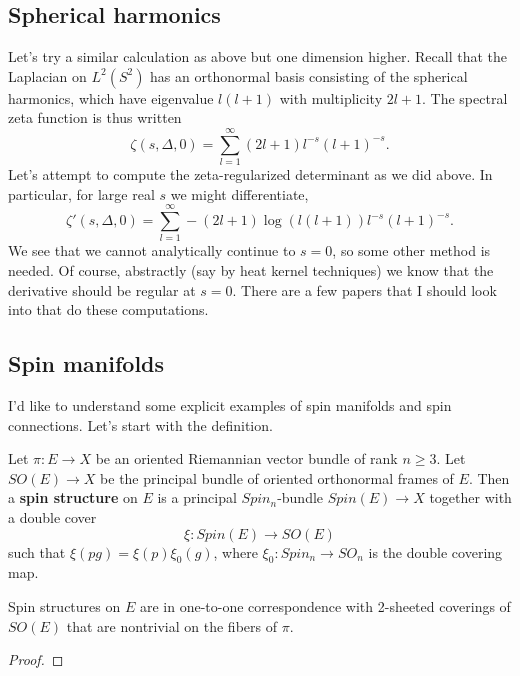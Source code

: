 \documentclass{amsart}
\begin{document}
\subsection{Spherical harmonics}

Let's try a similar calculation as above but one dimension higher. Recall
that the Laplacian on $L^2(S^2)$ has an orthonormal basis consisting of the
spherical harmonics, which have eigenvalue $l(l+1)$ with multiplicity $2l+1$.
The spectral zeta function is thus written
\begin{equation*}
    \zeta(s,\Delta,0) = \sum_{l=1}^\infty (2l+1)l^{-s}(l+1)^{-s}.
\end{equation*}
Let's attempt to compute the zeta-regularized determinant as we did above.
In particular, for large real $s$ we might differentiate,
\begin{equation*}
    \zeta'(s,\Delta,0) = \sum_{l=1}^\infty -(2l+1)\log(l(l+1)) l^{-s}(l+1)^{-s}.
\end{equation*}
We see that we cannot analytically continue to $s=0$, so some other method is
needed. Of course, abstractly (say by heat kernel techniques) we know that
the derivative should be regular at $s=0$. There are a few papers that I should
look into that do these computations.


\subsection{Spin manifolds}

I'd like to understand some explicit examples of spin manifolds and spin connections.
Let's start with the definition.
\begin{definition}
    Let $\pi:E\to X$ be an oriented Riemannian vector bundle of rank $n\geqslant 3$.
    Let $SO(E)\to X$ be the principal bundle of oriented orthonormal frames of $E$.
    Then a \textbf{spin structure} on $E$ is a principal $Spin_n$-bundle $Spin(E)\to X$
    together with a double cover
    \begin{equation*}
        \xi: Spin(E) \to SO(E)
    \end{equation*}
    such that $\xi(pg) = \xi(p)\xi_0(g)$, where $\xi_0:Spin_n\to SO_n$ is the
    double covering map.
\end{definition}

\begin{lemma}
    Spin structures on $E$ are in one-to-one correspondence with 2-sheeted
    coverings of $SO(E)$ that are nontrivial on the fibers of $\pi$.
\end{lemma}
\begin{proof}
\end{proof}
\end{document}
